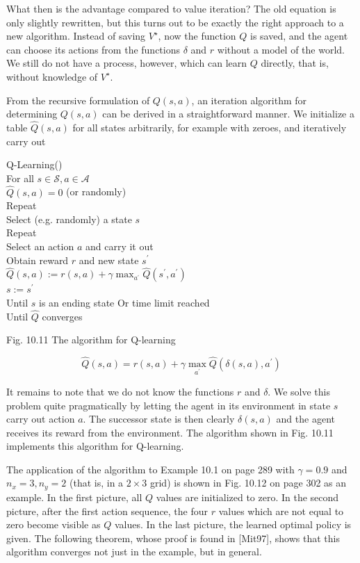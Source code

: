 \documentclass[10pt]{article}
\begin{document}
What then is the advantage compared to value iteration? The old equation is only slightly rewritten, but this turns out to be exactly the right approach to a new algorithm. Instead of saving $V^{\star}$, now the function $Q$ is saved, and the agent can choose its actions from the functions $\delta$ and $r$ without a model of the world. We still do not have a process, however, which can learn $Q$ directly, that is, without knowledge of $V^{\star}$.

From the recursive formulation of $Q(s, a)$, an iteration algorithm for determining $Q(s, a)$ can be derived in a straightforward manner. We initialize a table $\hat{Q}(s, a)$ for all states arbitrarily, for example with zeroes, and iteratively carry out

Q-Learning()\\
For all $s \in \mathcal{S}, a \in \mathcal{A}$\\
$\hat{Q}(s, a)=0$ (or randomly)\\
Repeat\\
Select (e.g. randomly) a state $s$\\
Repeat\\
Select an action $a$ and carry it out\\
Obtain reward $r$ and new state $s^{\prime}$\\
$\hat{Q}(s, a):=r(s, a)+\gamma \max _{a^{\prime}} \hat{Q}\left(s^{\prime}, a^{\prime}\right)$\\
$s:=s^{\prime}$\\
Until $s$ is an ending state Or time limit reached\\
Until $\hat{Q}$ converges

Fig. 10.11 The algorithm for Q-learning


\begin{equation*}
\hat{Q}(s, a)=r(s, a)+\gamma \max _{a^{\prime}} \hat{Q}\left(\delta(s, a), a^{\prime}\right) \tag{10.12}
\end{equation*}


It remains to note that we do not know the functions $r$ and $\delta$. We solve this problem quite pragmatically by letting the agent in its environment in state $s$ carry out action $a$. The successor state is then clearly $\delta(s, a)$ and the agent receives its reward from the environment. The algorithm shown in Fig. 10.11 implements this algorithm for Q-learning.

The application of the algorithm to Example 10.1 on page 289 with $\gamma=0.9$ and $n_{x}=3, n_{y}=2$ (that is, in a $2 \times 3$ grid) is shown in Fig. 10.12 on page 302 as an example. In the first picture, all $Q$ values are initialized to zero. In the second picture, after the first action sequence, the four $r$ values which are not equal to zero become visible as $Q$ values. In the last picture, the learned optimal policy is given. The following theorem, whose proof is found in [Mit97], shows that this algorithm converges not just in the example, but in general.
\end{document}
